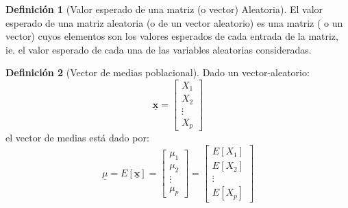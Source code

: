 \documentclass[
]{book}
\theoremstyle{definition}
\newtheorem{definition}{Definición}[chapter]
\theoremstyle{definition}
\theoremstyle{definition}
\theoremstyle{definition}
\theoremstyle{remark}
\begin{document}
\begin{definition}[Valor esperado de una matriz (o vector) Aleatoria]
\protect\hypertarget{def:valor-espera-mat}{}\label{def:valor-espera-mat}El valor esperado de una matriz aleatoria (o de un vector aleatorio) es una matriz ( o un vector) cuyos elementos son los valores esperados de cada entrada de la matriz, ie. el valor esperado de cada una de las variables aleatorias consideradas.
\end{definition}

\begin{definition}[Vector de medias poblacional]
\protect\hypertarget{def:vector-medias}{}\label{def:vector-medias}Dado un vector-aleatorio:
\[
\underline{\mathbf{x}}=\begin{bmatrix}
X_1 \\ X_2 \\ \vdots \\ X_p
\end{bmatrix}
\]
el vector de medias está dado por:
\[
\underline{\mu}=E[\underline{\mathbf{x}}]=\begin{bmatrix}
\mu_1\\ \mu_2 \\ \vdots \\  \mu_p
\end{bmatrix}=\begin{bmatrix}
E[X_1]\\ E[X_2]\\ \vdots \\ E[X_p]
\end{bmatrix}
\]
\end{definition}
\end{document}
